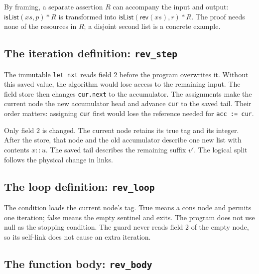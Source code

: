 \documentclass[11pt]{article}
\newcommand{\sep}{\mathbin{*}}
\begin{document}
By framing, a separate assertion \(R\) can accompany the input and output:
\(\mathsf{isList}(xs,p)\sep R\) is transformed into
\(\mathsf{isList}(\mathsf{rev}(xs),r)\sep R\). The proof needs none of the
resources in \(R\); a disjoint second list is a concrete example.

\subsection{The iteration definition: \texttt{rev\_step}}

\begin{minipage}{\linewidth}

\end{minipage}

The immutable \texttt{let nxt} reads field \(2\) before the program overwrites
it. Without this saved value, the algorithm would lose access to the remaining
input. The field store then changes \texttt{cur.next} to the accumulator.
The assignments make the current node the new accumulator head and advance
\texttt{cur} to the saved tail. Their order matters: assigning \texttt{cur}
first would lose the reference needed for \texttt{acc := cur}.

Only field \(2\) is changed. The current node retains its true tag and its
integer. After the store, that node and the old accumulator describe one new
list with contents \(x::u\). The saved tail describes the remaining suffix
\(v'\). The logical split follows the physical change in links.

\subsection{The loop definition: \texttt{rev\_loop}}

\begin{minipage}{\linewidth}

\end{minipage}

The condition loads the current node's tag. True means a cons node and permits
one iteration; false means the empty sentinel and exits. The program does not
use null as the stopping condition. The guard never reads field \(2\) of the
empty node, so its self-link does not cause an extra iteration.

\subsection{The function body: \texttt{rev\_body}}
\end{document}
